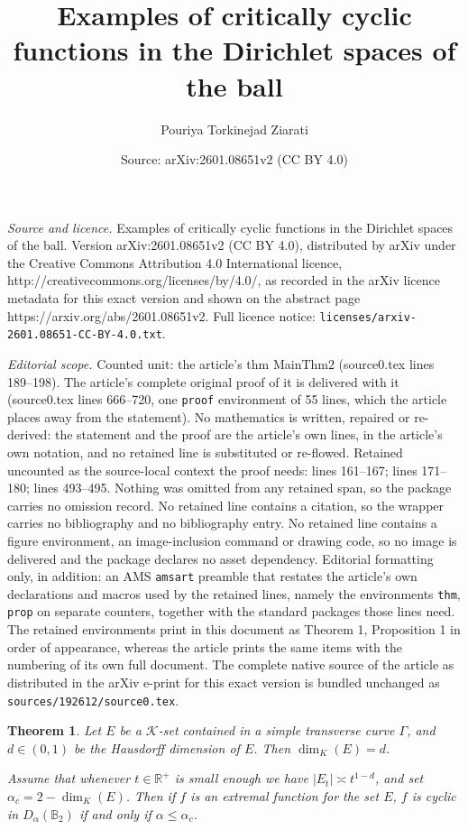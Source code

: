 \documentclass[10pt,a4paper]{amsart}
\title{Examples of critically cyclic functions in the Dirichlet spaces of the ball}
\author{Pouriya Torkinejad Ziarati}
\date{Source: arXiv:2601.08651v2 (CC BY 4.0)}
\newtheorem{thm}{Theorem}
\def\B{\mathbb{B}}
\def\R{\mathbb R}
\begin{document}
\maketitle

\noindent\emph{Source and licence.} Examples of critically cyclic functions in the Dirichlet spaces of the ball. Version arXiv:2601.08651v2 (CC BY 4.0), distributed by arXiv under the Creative Commons Attribution 4.0 International licence, http://creativecommons.org/licenses/by/4.0/, as recorded in the arXiv licence metadata for this exact version and shown on the abstract page https://arxiv.org/abs/2601.08651v2. Full licence notice: \texttt{licenses/arxiv-2601.08651-CC-BY-4.0.txt}.\par\smallskip

\noindent\textit{Editorial scope.} Counted unit: the article's thm MainThm2 (source0.tex lines 189--198). The article's complete original proof of it is delivered with it (source0.tex lines 666--720, one \texttt{proof} environment of 55 lines, which the article places away from the statement). No mathematics is written, repaired or re-derived: the statement and the proof are the article's own lines, in the article's own notation, and no retained line is substituted or re-flowed.  Retained uncounted as the source-local context the proof needs: lines 161--167; lines 171--180; lines 493--495.  Nothing was omitted from any retained span, so the package carries no omission record.  No retained line contains a citation, so the wrapper carries no bibliography and no bibliography entry.  No retained line contains a figure environment, an image-inclusion command or drawing code, so no image is delivered and the package declares no asset dependency.  Editorial formatting only, in addition: an AMS \texttt{amsart} preamble that restates the article's own declarations and macros used by the retained lines, namely the environments \texttt{thm}, \texttt{prop} on separate counters, together with the standard packages those lines need.  The retained environments print in this document as Theorem 1, Proposition 1 in order of appearance, whereas the article prints the same items with the numbering of its own full document.  The complete native source of the article as distributed in the arXiv e-print for this exact version is bundled unchanged as \texttt{sources/192612/source0.tex}.
        \begin{thm} \label{MainThm1}
Let $E$ be a $\mathcal{K}$-set contained in a simple transverse curve $\Gamma$, and $d \in (0,1)$ be the Hausdorff dimension of $E$. Then $\dim_{K}(E) = d$.

Assume that whenever $t \in \R^+$ is small enough we have $|E_t|  \asymp t^{1 - d}$, and set $\alpha_c = 2 - \dim_{K}(E)$.
Then if  $f$ is an extremal function for the set $E$,
$f$ is cyclic in $D_\alpha(\B_2)$ if and only if $\alpha \leq \alpha_c$.
        \end{thm}
\end{document}
